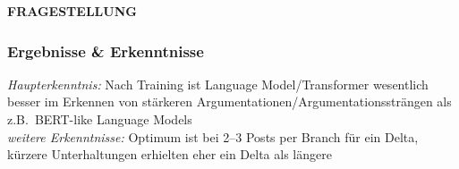 \documentclass[compress,12pt]{beamer}
\begin{document}
%

    \begin{frame}
        \centering
        \textbf{FRAGESTELLUNG}
    \end{frame}

    \begin{frame}
        \frametitle{Ergebnisse \& Erkenntnisse}
        \textit{Haupterkenntnis:} Nach Training ist Language Model/Transformer wesentlich besser im Erkennen von stärkeren Argumentationen/Argumentationssträngen als z.B.\ BERT-like Language Models \\
        \vspace{1pc}
        \textit{weitere Erkenntnisse:} Optimum ist bei 2--3 Posts per Branch für ein Delta, kürzere Unterhaltungen erhielten eher ein Delta als längere
    \end{frame}
\end{document}

